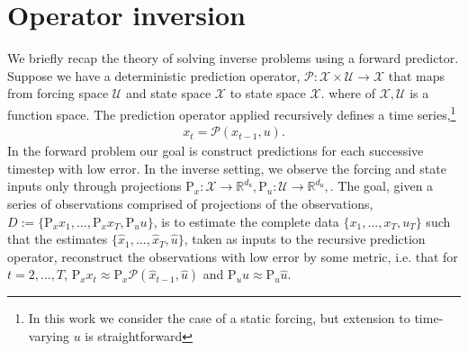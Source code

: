 \documentclass{article}
\newcommand{\mm}[1]{\mathrm{#1}}
\newcommand{\rv}[1]{\mathsf{#1}}
\newcommand{\set}[1]{#1}
\newcommand{\op}[1]{\mathscr{#1}}
\newcommand{\seenstate}[1]{\mm{P}_{x}{#1}}
\newcommand{\seeninp}[1]{\mm{P}_{u}{#1}}
\newcommand{\inp}{\rv{u}}
\newcommand{\inpst}{u}
\newcommand{\inpsp}{\mathcal{U}}
\newcommand{\state}{\rv{x}}
\newcommand{\statest}{x}
\newcommand{\statesp}{\mathcal{X}}
\begin{document}
\listoftodos

\section{Operator inversion}

We briefly recap the theory of solving inverse problems using a forward predictor.
Suppose we have a deterministic prediction operator,
\(\op{P}:\statesp\times  \inpsp \to \statesp\) that maps from forcing space \( \inpsp\) and state space \(\statesp\) to state space \(\statesp\). where of \(\statesp,\inpsp\) is a function space.
The prediction operator applied recursively defines a time series,\footnote{In this work we consider the case of a static forcing, but extension to time-varying \(\inpst\) is straightforward}
\begin{align*}
    \statest_{t}=\op{P}(\statest_{t-1}, \inpst).
\end{align*}
In the forward problem our goal is construct predictions for each successive timestep with low error.
In the inverse setting, we observe the forcing and state inputs only through projections \(\seenstate{}: \statesp \to \mathbb{R}^{d_\state},\seeninp{}: \inpsp \to \mathbb{R}^{d_\inp},\).
The goal, given a series of observations comprised of projections of the observations, \(\set{D}:=\{\seenstate{\statest}_{1},\dots, \seenstate{\statest}_{T},\seeninp{\inpst}\}\), is to estimate the complete data
\(\{\statest_{1},\dots, \statest_{T},\inpst_{T}\}\)
such that the estimates \(\{\hat{\statest}_{1},\dots,\hat{\statest}_{T},\hat{\inpst}\}\), taken as inputs to the recursive prediction operator, reconstruct the observations with low error by some metric, i.e. that for \(t=2,\dots,T\), 
\(\seenstate{\statest}_{t}\approx\seenstate{\op{P}}\left(\hat{\statest}_{t-1}, \hat{\inpst}\right)\) and \(\seeninp{\inpst}\approx\seeninp{\hat{\inpst}}\).
\end{document}
